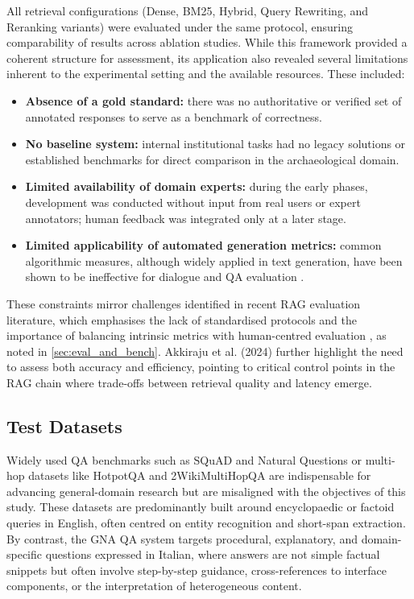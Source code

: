 \begin{spacing}{1.5}
All retrieval configurations (Dense, BM25, Hybrid, Query Rewriting, and Reranking variants) were evaluated under the same protocol, ensuring comparability of results across ablation studies. While this framework provided a coherent structure for assessment, its application also revealed several limitations inherent to the experimental setting and the available resources. These included:
\begin{itemize}
      \item \textbf{Absence of a gold standard:} there was no authoritative or verified set of annotated responses to serve as a benchmark of correctness.
      \item \textbf{No baseline system:} internal institutional tasks had no legacy solutions or established benchmarks for direct comparison in the archaeological domain.
      \item \textbf{Limited availability of domain experts:} during the early phases, development was conducted without input from real users or expert annotators; human feedback was integrated only at a later stage.
      \item \textbf{Limited applicability of automated generation metrics:} common algorithmic measures, although widely applied in text generation, have been shown to be ineffective for dialogue and QA evaluation \citep{deriu_survey_2020,liu_how_2016}.
\end{itemize}

These constraints mirror challenges identified in recent RAG evaluation literature, which emphasises the lack of standardised protocols and the importance of balancing intrinsic metrics with human-centred evaluation \citep{abeysinghe_challenges_2024}, as noted in \autoref{sec:eval_and_bench}. Akkiraju et al. (2024) further highlight the need to assess both accuracy and efficiency, pointing to critical control points in the RAG chain where trade-offs between retrieval quality and latency emerge.


\subsection{Test Datasets}\label{sec:datasets}
Widely used QA benchmarks such as SQuAD and Natural Questions or multi-hop datasets like HotpotQA \citep{yang_hotpotqa_2018} and 2WikiMultiHopQA \citep{ho_constructing_2020} are indispensable for advancing general-domain research but are misaligned with the objectives of this study. These datasets are predominantly built around encyclopaedic or factoid queries in English, often centred on entity recognition and short-span extraction. By contrast, the GNA QA system targets procedural, explanatory, and domain-specific questions expressed in Italian, where answers are not simple factual snippets but often involve step-by-step guidance, cross-references to interface components, or the interpretation of heterogeneous content.


\end{spacing}
